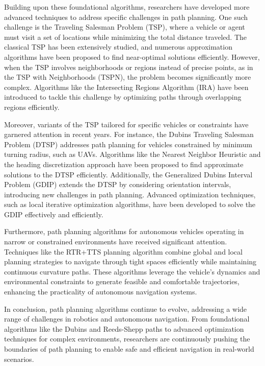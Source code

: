 \vspace*{6mm}

Building upon these foundational algorithms, researchers have developed more advanced techniques to address specific challenges in path planning. One such challenge is the Traveling Salesman Problem (TSP), where a vehicle or agent must visit a set of locations while minimizing the total distance traveled. The classical TSP has been extensively studied, and numerous approximation algorithms have been proposed to find near-optimal solutions efficiently. However, when the TSP involves neighborhoods or regions instead of precise points, as in the TSP with Neighborhoods (TSPN), the problem becomes significantly more complex. Algorithms like the Intersecting Regions Algorithm (IRA) have been introduced to tackle this challenge by optimizing paths through overlapping regions efficiently.

\vspace*{6mm}

Moreover, variants of the TSP tailored for specific vehicles or constraints have garnered attention in recent years. For instance, the Dubins Traveling Salesman Problem (DTSP) addresses path planning for vehicles constrained by minimum turning radius, such as UAVs. Algorithms like the Nearest Neighbor Heuristic and the heading discretization approach have been proposed to find approximate solutions to the DTSP efficiently. Additionally, the Generalized Dubins Interval Problem (GDIP) extends the DTSP by considering orientation intervals, introducing new challenges in path planning. Advanced optimization techniques, such as local iterative optimization algorithms, have been developed to solve the GDIP effectively and efficiently. 

\vspace*{6mm}

Furthermore, path planning algorithms for autonomous vehicles operating in narrow or constrained environments have received significant attention. Techniques like the RTR+TTS planning algorithm combine global and local planning strategies to navigate through tight spaces efficiently while maintaining continuous curvature paths. These algorithms leverage the vehicle's dynamics and environmental constraints to generate feasible and comfortable trajectories, enhancing the practicality of autonomous navigation systems.

\vspace*{6mm}

In conclusion, path planning algorithms continue to evolve, addressing a wide range of challenges in robotics and autonomous navigation. From foundational algorithms like the Dubins and Reeds-Shepp paths to advanced optimization techniques for complex environments, researchers are continuously pushing the boundaries of path planning to enable safe and efficient navigation in real-world scenarios.